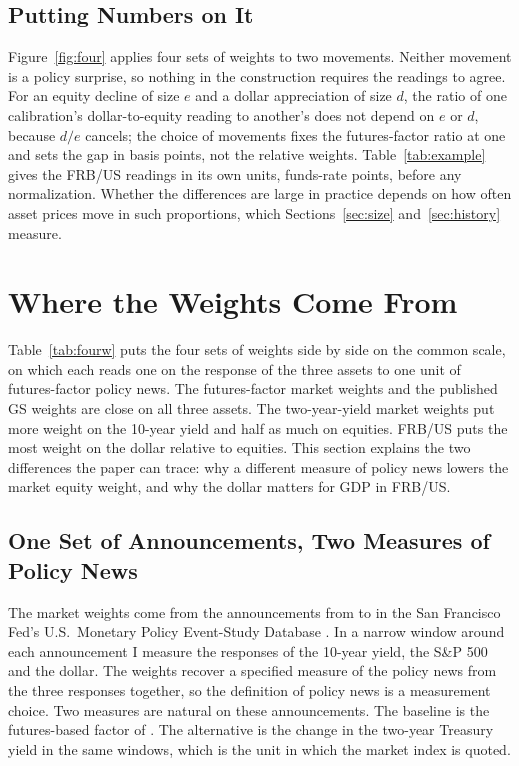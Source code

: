 \documentclass[11pt]{article}
\begin{document}
\subsection{Putting Numbers on It}\label{sec:requires}
Figure~\ref{fig:four} applies four sets of weights to two movements. Neither movement is a policy surprise, so nothing in the construction requires the readings to agree. For an equity decline of size $e$ and a dollar appreciation of size $d$, the ratio of one calibration's dollar-to-equity reading to another's does not depend on $e$ or $d$, because $d/e$ cancels; the choice of movements fixes the futures-factor ratio at one and sets the gap in basis points, not the relative weights. Table~\ref{tab:example} gives the FRB/US readings in its own units, funds-rate points, before any normalization. Whether the differences are large in practice depends on how often asset prices move in such proportions, which Sections~\ref{sec:size} and~\ref{sec:history} measure.
\FloatBarrier

\section{Where the Weights Come From}\label{sec:agree}
Table~\ref{tab:fourw} puts the four sets of weights side by side on the common scale, on which each reads one on the response of the three assets to one unit of futures-factor policy news. The futures-factor market weights and the published GS weights are close on all three assets. The two-year-yield market weights put more weight on the 10-year yield and half as much on equities. FRB/US puts the most weight on the dollar relative to equities. This section explains the two differences the paper can trace: why a different measure of policy news lowers the market equity weight, and why the dollar matters for GDP in FRB/US.



\subsection{One Set of Announcements, Two Measures of Policy News}\label{sec:signal}
The market weights come from the  announcements from  to  in the San Francisco Fed's U.S.\ Monetary Policy Event-Study Database \citep{acosta2025}. In a narrow window around each announcement I measure the responses of the 10-year yield, the S\&P 500 and the dollar. The weights recover a specified measure of the policy news from the three responses together, so the definition of policy news is a measurement choice. Two measures are natural on these announcements. The baseline is the futures-based factor of \citet{nakamura2018}. The alternative is the change in the two-year Treasury yield in the same windows, which is the unit in which the market index is quoted.
\end{document}

